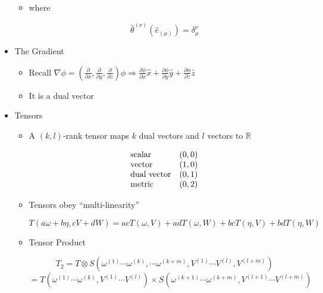 \begin{itemize}
\begin{itemize}
      \item where 

        $$\hat{\theta}^{(\nu)}\left( \hat{e}_{(\mu)} \right)=\delta^{\nu}_{\mu}$$

    \end{itemize}

  \item The Gradient

    \begin{itemize}

      \item Recall $\nabla\phi=\left( \frac{\partial}{\partial x},\frac{\partial}{\partial y},\frac{\partial}{\partial z} \right)\phi\Rightarrow\frac{\partial\phi}{\partial x}\hat{x}+\frac{\partial\phi}{\partial y}\hat{y}+\frac{\partial \phi}{\partial z}\hat{z}$

      \item It is a dual vector

    \end{itemize}

  \item Tensors

    \begin{itemize}

      \item A $(k,l)$-rank tensor maps $k$ dual vectors and $l$ vectors to $\mathbb{R}$

        \begin{center}
          $$\begin{array}{l l}\text{scalar} & (0,0)\\ \text{vector} & (1,0)\\\text{dual vector} & (0,1)\\\text{metric} & (0,2)\end{array}$$
        \end{center}

      \item Tensors obey ``multi-linearity''

        $$T(a\omega+b\eta,cV+dW)=acT(\omega,V)+adT(\omega,W)+bcT(\eta,V)+bdT(\eta,W)$$

      \item Tensor Product

        $$T_2=T\otimes S(\omega^(1)\cdots\omega^{(k)}, \cdots\omega^{(k+m)},V^{(1)}\cdots V^{(l)}, V^{(l+m)})$$
        $$=T(\omega^{(1)}\cdots\omega^{(k)},V^{(1)}\cdots V^{(l)})\times S(\omega^{(k+1)}\cdots\omega^{(k+m)},V^{(l+1)}\cdots V^{(l+m)})$$


\end{itemize}
\end{itemize}
